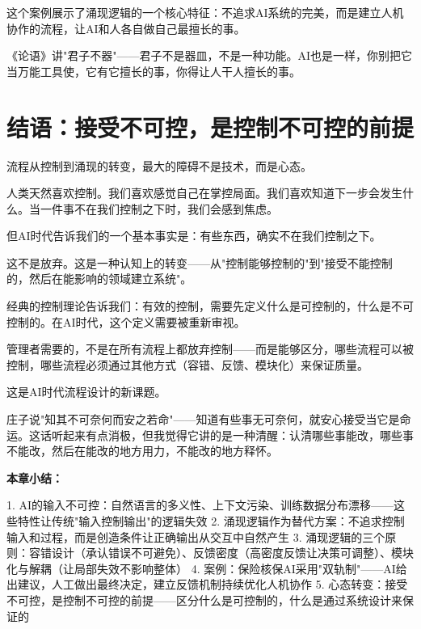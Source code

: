 这个案例展示了涌现逻辑的一个核心特征：不追求AI系统的完美，而是建立人机协作的流程，让AI和人各自做自己最擅长的事。

《论语》讲"君子不器"——君子不是器皿，不是一种功能。AI也是一样，你别把它当万能工具使，它有它擅长的事，你得让人干人擅长的事。

\section{结语：接受不可控，是控制不可控的前提}


流程从控制到涌现的转变，最大的障碍不是技术，而是心态。

人类天然喜欢控制。我们喜欢感觉自己在掌控局面。我们喜欢知道下一步会发生什么。当一件事不在我们控制之下时，我们会感到焦虑。

但AI时代告诉我们的一个基本事实是：有些东西，确实不在我们控制之下。

这不是放弃。这是一种认知上的转变——从"控制能够控制的"到"接受不能控制的，然后在能影响的领域建立系统"。

经典的控制理论告诉我们：有效的控制，需要先定义什么是可控制的，什么是不可控制的。在AI时代，这个定义需要被重新审视。

管理者需要的，不是在所有流程上都放弃控制——而是能够区分，哪些流程可以被控制，哪些流程必须通过其他方式（容错、反馈、模块化）来保证质量。

这是AI时代流程设计的新课题。

庄子说"知其不可奈何而安之若命"——知道有些事无可奈何，就安心接受当它是命运。这话听起来有点消极，但我觉得它讲的是一种清醒：认清哪些事能改，哪些事不能改，然后在能改的地方用力，不能改的地方释怀。


\textbf{本章小结：}

1. AI的输入不可控：自然语言的多义性、上下文污染、训练数据分布漂移——这些特性让传统"输入控制输出"的逻辑失效
2. 涌现逻辑作为替代方案：不追求控制输入和过程，而是创造条件让正确输出从交互中自然产生
3. 涌现逻辑的三个原则：容错设计（承认错误不可避免）、反馈密度（高密度反馈让决策可调整）、模块化与解耦（让局部失效不影响整体）
4. 案例：保险核保AI采用"双轨制"——AI给出建议，人工做出最终决定，建立反馈机制持续优化人机协作
5. 心态转变：接受不可控，是控制不可控的前提——区分什么是可控制的，什么是通过系统设计来保证的
